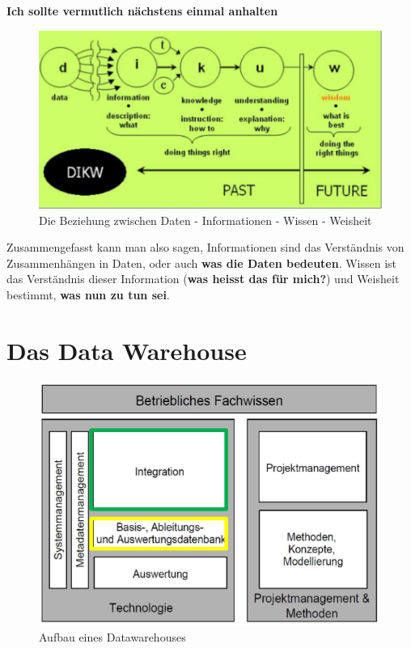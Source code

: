 \documentclass[a4paper, 11pt]{article}
\begin{document}
\begin{center}
\textbf{	Ich sollte vermutlich nächstens einmal anhalten}
\end{center}

\vspace*{20px}

\begin{figure}[htb]
	\centering
	\includegraphics[keepaspectratio=true,height=15\baselineskip]{DIKW.PNG}
	\caption{Die Beziehung zwischen Daten - Informationen - Wissen - Weisheit}
	\label{fig:DIKW}
\end{figure}

Zusammengefasst kann man also sagen, Informationen sind das Verständnis von Zusammenhängen in Daten, oder auch \textbf{was die Daten bedeuten}. Wissen ist das Verständnis dieser Information (\textbf{was heisst das für mich?}) und Weisheit bestimmt, \textbf{was nun zu tun sei}. 
\newpage

\section{Das Data Warehouse}

\begin{figure}
	\centering
	\includegraphics[keepaspectratio=true,height=10\baselineskip]{datawarehouse.PNG}
	\caption{Aufbau eines Datawarehouses}
	\label{fig:datawarehouse}
\end{figure}
\end{document}
